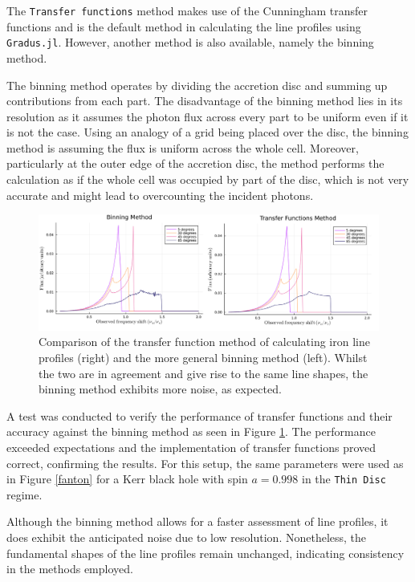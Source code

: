 \documentclass[fleqn,usenatbib,useAMS]{mnras}
\begin{document}
The {\tt Transfer functions} method makes use of the Cunningham transfer functions \cite{cunningham1975effects} and is the default method in calculating the line profiles using {\tt Gradus.jl}. However, another method is also available, namely the binning method. 

The binning method operates by dividing the accretion disc and summing up contributions from each part. The disadvantage of the binning method lies in its resolution as it assumes the photon flux across every part to be uniform even if it is not the case. Using an analogy of a grid being placed over the disc, the binning method is assuming the flux is uniform across the whole cell. Moreover, particularly at the outer edge of the accretion disc, the method performs the calculation as if the whole cell was occupied by part of the disc, which is not very accurate and might lead to overcounting the incident photons.


\begin{figure}[!t]
    \centering
    \includegraphics[width=0.98\linewidth]{figures/comparison.png}
    \caption{Comparison of the transfer function method of calculating iron line profiles (right) and the more general binning method (left). Whilst the two are in agreement and give rise to the same line shapes, the binning method exhibits more noise, as expected.}
    \label{comparison}
\end{figure}

A test was conducted to verify the performance of transfer functions and their accuracy against the binning method as seen in Figure \ref{comparison}. The performance exceeded expectations and the implementation of transfer functions proved correct, confirming the results. For this setup, the same parameters were used as in Figure \ref{fanton} for a Kerr black hole with spin $a = 0.998$ in the {\tt Thin Disc} regime. 

Although the binning method allows for a faster assessment of line profiles, it does exhibit the anticipated noise due to low resolution. Nonetheless, the fundamental shapes of the line profiles remain unchanged, indicating consistency in the methods employed.
\end{document}
